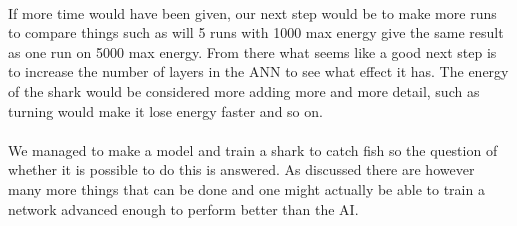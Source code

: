 \\
If more time would have been given, our next step would be to make more runs to compare things such as will 5 runs with 1000 max energy give the same result as one run on 5000 max energy. From there what seems like a good next step is to increase the number of layers in the ANN to see what effect it has. The energy of the shark would be considered more adding more and more detail, such as turning would make it lose energy faster and so on.\\
\\
We managed to make a model and train a shark to catch fish so the question of whether it is possible to do this is answered. As discussed there are however many more things that can be done and one might actually be able to train a network advanced enough to perform better than the AI.
